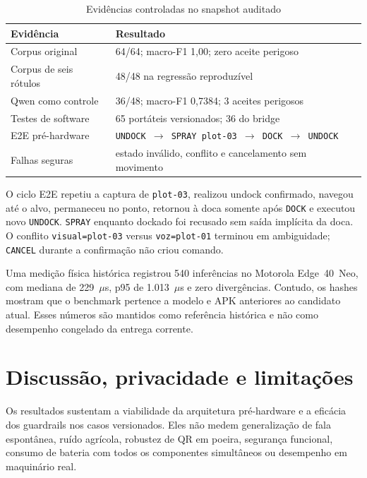 \documentclass[conference]{IEEEtran}
\begin{document}
\begin{table}[t]
\caption{Evidências controladas no snapshot auditado}
\label{tab:results}
\centering
\small
\begin{tabular}{p{2.3cm}p{4.8cm}}
\toprule
\textbf{Evidência} & \textbf{Resultado} \\
\midrule
Corpus original & 64/64; macro-F1 1,00; zero aceite perigoso \\
Corpus de seis rótulos & 48/48 na regressão reproduzível \\
Qwen como controle & 36/48; macro-F1 0,7384; 3 aceites perigosos \\
Testes de software & 65 portáteis versionados; 36 do bridge \\
E2E pré-hardware & \texttt{UNDOCK $\rightarrow$ SPRAY plot-03 $\rightarrow$ DOCK $\rightarrow$ UNDOCK} \\
Falhas seguras & estado inválido, conflito e cancelamento sem movimento \\
\bottomrule
\end{tabular}
\end{table}

O ciclo E2E repetiu a captura de \texttt{plot-03}, realizou undock confirmado, navegou até o alvo, permaneceu no ponto, retornou à doca somente após \texttt{DOCK} e executou novo \texttt{UNDOCK}. \texttt{SPRAY} enquanto dockado foi recusado sem saída implícita da doca. O conflito \texttt{visual=plot-03} versus \texttt{voz=plot-01} terminou em ambiguidade; \texttt{CANCEL} durante a confirmação não criou comando.

Uma medição física histórica registrou 540 inferências no Motorola Edge~40~Neo, com mediana de 229~$\mu$s, p95 de 1.013~$\mu$s e zero divergências. Contudo, os hashes mostram que o benchmark pertence a modelo e APK anteriores ao candidato atual. Esses números são mantidos como referência histórica e não como desempenho congelado da entrega corrente.

\section{Discussão, privacidade e limitações}

Os resultados sustentam a viabilidade da arquitetura pré-hardware e a eficácia dos guardrails nos casos versionados. Eles não medem generalização de fala espontânea, ruído agrícola, robustez de QR em poeira, segurança funcional, consumo de bateria com todos os componentes simultâneos ou desempenho em maquinário real.
\end{document}
